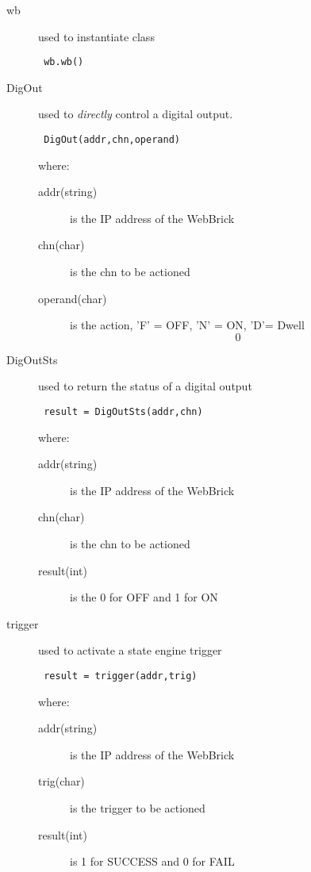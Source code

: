 \begin{description}
	\item[wb] used to instantiate class
		\begin{verbatim} wb.wb() \end{verbatim}
		
	\item[DigOut] used to {\em directly} control a digital output.
		\begin{verbatim} DigOut(addr,chn,operand) \end{verbatim}
		where:
		\begin{description}
			\item[addr(string)] is the IP address of the WebBrick
			\item[chn(char)] is the chn to be actioned
			\item[operand(char)] is the action, 'F' = OFF, 'N' = ON, 'D'= Dwell\[0\]
		\end{description}

	\item[DigOutSts] used to return the status of a digital output
		\begin{verbatim} result = DigOutSts(addr,chn) \end{verbatim}
		where:
		\begin{description}
			\item[addr(string)] is the IP address of the WebBrick
			\item[chn(char)] is the chn to be actioned
			\item[result(int)] is the 0 for OFF and 1 for ON
		\end{description}
	
	\item[trigger] used to activate a state engine trigger
		\begin{verbatim} result = trigger(addr,trig) \end{verbatim}
		where:
		\begin{description}
			\item[addr(string)] is the IP address of the WebBrick
			\item[trig(char)] is the trigger to be actioned
			\item[result(int)] is 1 for SUCCESS and 0 for FAIL
		\end{description}


\end{description}
